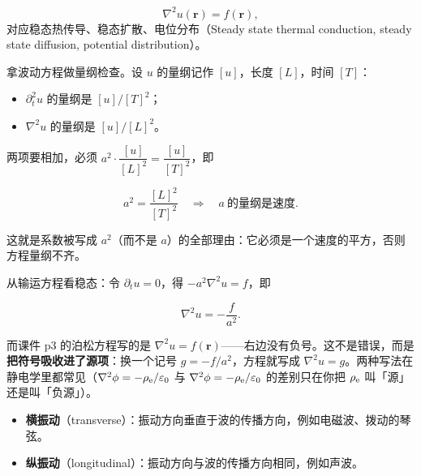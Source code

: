 \[
\nabla^2u(\mathbf r)=f(\mathbf r),
\]
对应稳态热传导、稳态扩散、电位分布（Steady state thermal conduction, steady state diffusion, potential distribution）。



拿波动方程做量纲检查。设 $u$ 的量纲记作 $[u]$，长度 $[L]$，时间 $[T]$：

\begin{itemize}
\item $\partial_t^2u$ 的量纲是 $[u]/[T]^2$；
\item $\nabla^2u$ 的量纲是 $[u]/[L]^2$。
\end{itemize}

两项要相加，必须 $a^2\cdot\dfrac{[u]}{[L]^2}=\dfrac{[u]}{[T]^2}$，即

\[
a^2=\frac{[L]^2}{[T]^2}\quad\Longrightarrow\quad a\ \text{的量纲是速度}.
\]

这就是系数被写成 $a^2$（而不是 $a$）的全部理由：它必须是一个速度的平方，否则方程量纲不齐。


从输运方程看稳态：令 $\partial_t u=0$，得 $-a^2\nabla^2u=f$，即

\[
\nabla^2u=-\frac{f}{a^2}.
\]

而课件 p3 的泊松方程写的是 $\nabla^2u=f(\mathbf r)$——右边没有负号。这不是错误，而是\textbf{把符号吸收进了源项}：换一个记号 $g=-f/a^2$，方程就写成 $\nabla^2u=g$。两种写法在静电学里都常见（$\nabla^2\phi=-\rho_{\rm e}/\varepsilon_0$ 与 $\nabla^2\phi=-\rho_{\rm e}/\varepsilon_0$ 的差别只在你把 $\rho_{\rm e}$ 叫「源」还是叫「负源」）。


\label{sec:712}



\begin{itemize}
\item \textbf{横振动}（transverse）：振动方向垂直于波的传播方向，例如电磁波、拨动的琴弦。
\item \textbf{纵振动}（longitudinal）：振动方向与波的传播方向相同，例如声波。
\end{itemize}

